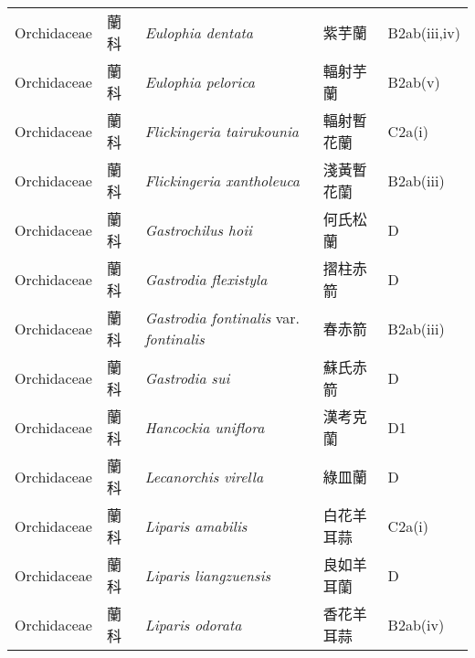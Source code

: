 {\begin{longtable}{p{2.5cm}p{2.5cm}p{4.5cm}p{2.5cm}p{3cm}}
    Orchidaceae & 蘭科 & \textit{Eulophia dentata}  & 紫芋蘭 & B2ab(iii,iv) \index{Eulophia@\textit{Eulophia}!dentata@\textit{dentata}}  \index{紫芋蘭} \\
    Orchidaceae & 蘭科 & \textit{Eulophia pelorica}  & 輻射芋蘭 & B2ab(v) \index{Eulophia@\textit{Eulophia}!pelorica@\textit{pelorica}}  \index{輻射芋蘭} \\
    Orchidaceae & 蘭科 & \textit{Flickingeria tairukounia}  & 輻射暫花蘭 & C2a(i) \index{Flickingeria@\textit{Flickingeria}!tairukounia@\textit{tairukounia}}  \index{輻射暫花蘭} \\
    Orchidaceae & 蘭科 & \textit{Flickingeria xantholeuca}  & 淺黃暫花蘭 & B2ab(iii) \index{Flickingeria@\textit{Flickingeria}!xantholeuca@\textit{xantholeuca}}  \index{淺黃暫花蘭} \\
    Orchidaceae & 蘭科 & \textit{Gastrochilus hoii}  & 何氏松蘭 & D \index{Gastrochilus@\textit{Gastrochilus}!hoii@\textit{hoii}}  \index{何氏松蘭} \\
    Orchidaceae & 蘭科 & \textit{Gastrodia flexistyla}  & 摺柱赤箭 & D \index{Gastrodia@\textit{Gastrodia}!flexistyla@\textit{flexistyla}}  \index{摺柱赤箭} \\
    Orchidaceae & 蘭科 & \textit{Gastrodia fontinalis} var. \textit{fontinalis}  & 春赤箭 & B2ab(iii) \index{Gastrodia@\textit{Gastrodia}!fontinalis@\textit{fontinalis}!var. fontinalis@var. \textit{fontinalis}}  \index{春赤箭} \\
    Orchidaceae & 蘭科 & \textit{Gastrodia sui}  & 蘇氏赤箭 & D \index{Gastrodia@\textit{Gastrodia}!sui@\textit{sui}}  \index{蘇氏赤箭} \\
    Orchidaceae & 蘭科 & \textit{Hancockia uniflora}  & 漢考克蘭 & D1 \index{Hancockia@\textit{Hancockia}!uniflora@\textit{uniflora}}  \index{漢考克蘭} \\
    Orchidaceae & 蘭科 & \textit{Lecanorchis virella}  & 綠皿蘭 & D \index{Lecanorchis@\textit{Lecanorchis}!virella@\textit{virella}}  \index{綠皿蘭} \\
    Orchidaceae & 蘭科 & \textit{Liparis amabilis}  & 白花羊耳蒜 & C2a(i) \index{Liparis@\textit{Liparis}!amabilis@\textit{amabilis}}  \index{白花羊耳蒜} \\
    Orchidaceae & 蘭科 & \textit{Liparis liangzuensis}  & 良如羊耳蘭 & D \index{Liparis@\textit{Liparis}!liangzuensis@\textit{liangzuensis}}  \index{良如羊耳蘭} \\
    Orchidaceae & 蘭科 & \textit{Liparis odorata}  & 香花羊耳蒜 & B2ab(iv) \index{Liparis@\textit{Liparis}!odorata@\textit{odorata}}  \index{香花羊耳蒜} \\

\end{longtable}}
